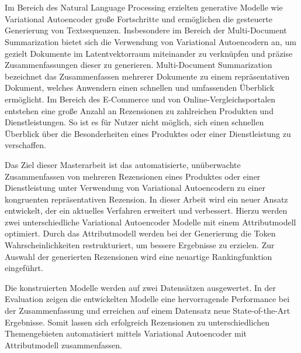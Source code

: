 \section*{}
Im Bereich des Natural Language Processing erzielten generative Modelle wie Variational Autoencoder große Fortschritte und ermöglichen die gesteuerte Generierung von Textsequenzen.
Insbesondere im Bereich der Multi-Document Summarization bietet sich die Verwendung von Variational Autoencodern an, um gezielt Dokumente im Latentvektorraum miteinander zu verknüpfen und präzise Zusammenfassungen dieser zu generieren.
Multi-Document Summarization bezeichnet das Zusammenfassen mehrerer Dokumente zu einem repräsentativen Dokument, welches Anwendern einen schnellen und umfassenden Überblick ermöglicht.
Im Bereich des E-Commerce und von Online-Vergleichsportalen entstehen eine große Anzahl an Rezensionen zu zahlreichen Produkten und Dienstleistungen.
So ist es für Nutzer nicht möglich, sich einen schnellen Überblick über die Besonderheiten eines Produktes oder einer Dienstleistung zu verschaffen.

Das Ziel dieser Masterarbeit ist das automatisierte, unüberwachte Zusammenfassen von mehreren Rezensionen eines Produktes oder einer Dienstleistung unter Verwendung von Variational Autoencodern zu einer kongruenten repräsentativen Rezension.
In dieser Arbeit wird ein neuer Ansatz entwickelt, der ein aktuelles Verfahren erweitert und verbessert.
Hierzu werden zwei unterschiedliche Variational Autoencoder Modelle mit einem Attributmodell optimiert.
Durch das Attributmodell werden bei der Generierung die Token Wahrscheinlichkeiten restrukturiert, um bessere Ergebnisse zu erzielen.
Zur Auswahl der generierten Rezensionen wird eine neuartige Rankingfunktion eingeführt.

Die konstruierten Modelle werden auf zwei Datensätzen ausgewertet.
In der Evaluation zeigen die entwickelten Modelle eine hervorragende Performance bei der Zusammenfassung und erreichen auf einem Datensatz neue State-of-the-Art Ergebnisse.
Somit lassen sich erfolgreich Rezensionen zu unterschiedlichen Themengebieten automatisiert mittels Variational Autoencoder mit Attributmodell zusammenfassen.





